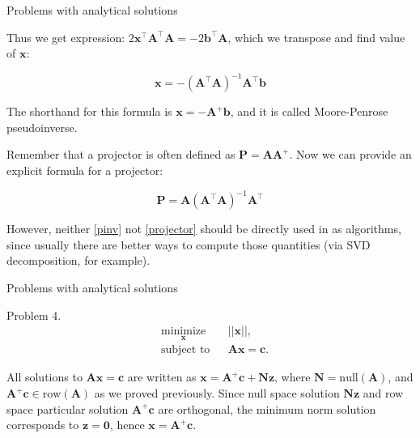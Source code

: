 \documentclass{beamer}
\begin{document}
\begin{frame}{Problems with analytical solutions}
\begin{flushleft}

Thus we get expression: $2\mathbf{x}^\top\mathbf{A}^\top\mathbf{A} = -2\mathbf{b}^\top\mathbf{A}$, which we transpose and find value of $\mathbf{x}$:

\begin{equation} \label{pinv}
\mathbf{x} = -(\mathbf{A}^\top\mathbf{A})^{-1}\mathbf{A}^\top\mathbf{b}
\end{equation}

The shorthand for this formula is $\mathbf{x} = -\mathbf{A}^+\mathbf{b}$, and it is called Moore-Penrose pseudoinverse.

\bigskip

Remember that a projector is often defined as $\mathbf{P} = \mathbf{A}\mathbf{A}^+$. Now we can provide an explicit formula for a projector:

\begin{equation} \label{projector}
\mathbf{P} = \mathbf{A}(\mathbf{A}^\top\mathbf{A})^{-1}\mathbf{A}^\top
\end{equation}

However, neither \eqref{pinv} not \eqref{projector} should be directly used in as algorithms, since usually there are better ways to compute those quantities (via SVD decomposition, for example).

\end{flushleft}
\end{frame}





\begin{frame}{Problems with analytical solutions}
\begin{flushleft}


Problem 4. 
%
\begin{equation}
\begin{aligned}
& \underset{\mathbf{x}}{\text{minimize}}
& & || \mathbf{x} ||, \\
& \text{subject to}
& & \mathbf{A} \mathbf{x} = \mathbf{c}.
\end{aligned}
\end{equation}


All solutions to $\mathbf{A} \mathbf{x} = \mathbf{c}$ are written as $\mathbf{x} = \mathbf{A}^+\mathbf{c} + \mathbf{N}\mathbf{z}$, where $\mathbf{N} = \text{null}(\mathbf{A})$, and $\mathbf{A}^+\mathbf{c} \in \text{row}(\mathbf{A})$ as we proved previously. Since null space solution $\mathbf{N}\mathbf{z}$ and row space particular solution $\mathbf{A}^+\mathbf{c}$ are orthogonal, the minimum norm solution corresponds to $\mathbf{z} = \mathbf{0}$, hence $\mathbf{x} = \mathbf{A}^+\mathbf{c}$.



\end{flushleft}
\end{frame}
\end{document}
